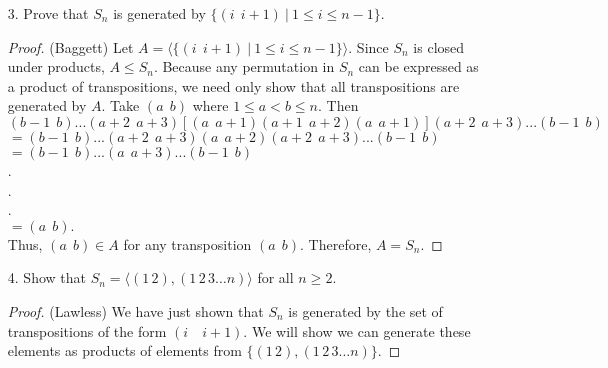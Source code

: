 \documentclass[10pt]{article}
\newcommand{\la}{\langle}
\newcommand{\ra}{\rangle}
\begin{document}
\begin{itemize}

\item[3.] Prove that $S_n$ is generated by $\{(i \ \ i+1)\  | \ 1 \leq i \leq n-1 \}$.

\begin{proof}(Baggett) Let $A = \langle\{(i \ \ i+1)\  | \ 1 \leq i \leq n-1 \}\rangle$. Since $S_n$ is
closed under products, $A \leq S_n$. Because any permutation in
$S_n$ can be expressed as a product of transpositions, we need only
show that all transpositions are generated by $A$. Take $(a \ \ b)$
where $1 \leq a < b \leq n$. Then
\\$(b-1 \ \ b)...(a+2 \ \ a+3)[(a \ \ a+1)(a+1 \ \ a+2)(a \ \ a+1)](a+2 \ \ a+3)...(b-1 \ \ b)$
\\ \hspace*{1cm}$= (b-1 \ \ b)...(a+2 \ \ a+3)(a \ \ a+2)(a+2 \ \ a+3)...(b-1 \ \ b)$
\\ \hspace*{1cm}$= (b-1 \ \ b)...(a \ \ a+3)...(b-1 \ \ b)$
\\ \hspace*{1cm}.
\\ \hspace*{1cm}.
\\ \hspace*{1cm}.
\\ \hspace*{1cm}$= (a \ \ b).$
\\ Thus, $(a \ \ b) \in A$ for any transposition $(a \ \ b)$. Therefore, $A = S_n$.
\end{proof}

\item[4.] Show that $S_n = \la (1 \, 2), (1 \, 2 \, 3 \ldots n) \ra$ for all $n \geq 2$.


\begin{proof} (Lawless)
We have just shown that $S_n$ is generated by the set of transpositions of the form $(i \quad i+1)$. We will show we can generate these elements as products of elements from $\{(1 \, 2), (1 \, 2 \, 3 \ldots n)\}$. 


\end{proof}
\end{itemize}
\end{document}
